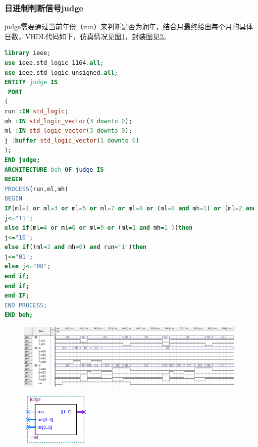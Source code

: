 \documentclass[12pt]{article}
\begin{document}
\subsubsection{日进制判断信号judge}
judge需要通过当前年份（run）来判断是否为润年，结合月最终给出每个月的具体日数，VHDL代码如下，仿真情况见图\ref{fig:fzjud}，封装图见\ref{fig:fengzhuangjud}。
\begin{lstlisting}[language=VHDL]
library ieee;
use ieee.std_logic_1164.all;
use ieee.std_logic_unsigned.all;
ENTITY judge IS 
 PORT
(
run :IN std_logic;
mh :IN std_logic_vector(3 downto 0);
ml :IN std_logic_vector(3 downto 0);
j :buffer std_logic_vector(1 downto 0)
);
END judge;
ARCHITECTURE beh OF judge IS
BEGIN
PROCESS(run,ml,mh)
BEGIN
IF(ml=1 or ml=3 or ml=5 or ml=7 or ml=8 or (ml=0 and mh=1) or (ml=2 and mh=1 ) )THEN
j<="11";
else if(ml=4 or ml=6 or ml=9 or (ml=1 and mh=1 ))then
j<="10";
else if((ml=2 and mh=0) and run='1')then
j<="01";
else j<="00";
end if;
end if;
end IF;
END PROCESS;
END beh;
\end{lstlisting}
\begin{figure}[hp]
	\centering  
	\includegraphics[width=\textwidth]{picture/fzjude.png} 
	\caption{}
	\label{fig:fzjud}   
\end{figure}
\begin{figure}[hp]
	\centering  
	\includegraphics[width=0.3\textwidth]{picture/judfz.png} 
	\caption{}
	\label{fig:fengzhuangjud}   
\end{figure}
\end{document}
